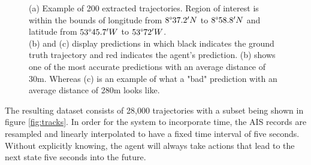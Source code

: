 \documentclass[conference]{IEEEtran}
\begin{document}
\begin{figure}[t]
    \centering
    \caption{(a) Example of 200 extracted trajectories. Region of interest is within the bounds of longitude from $8\degree37.2'N$ to $8\degree58.8'N$ and latitude from $53\degree45.7'W$ to $53\degree72'W$.\\
    (b) and (c) display predictions in which black indicates the ground truth trajectory and red indicates the agent's prediction. (b) shows one of the most accurate predictions with an average distance of 30m. Whereas (c) is an example of what a "bad" prediction with an average distance of 280m looks like.}
    \label{fig:foobar}
\end{figure}
The resulting dataset consists of 28,000 trajectories with a subset being shown in figure \ref{fig:tracks}. In order for the system to incorporate time, the AIS records are resampled and linearly interpolated to have a fixed time interval of five seconds. Without explicitly knowing, the agent will always take actions that lead to the next state five seconds into the future.
\end{document}
